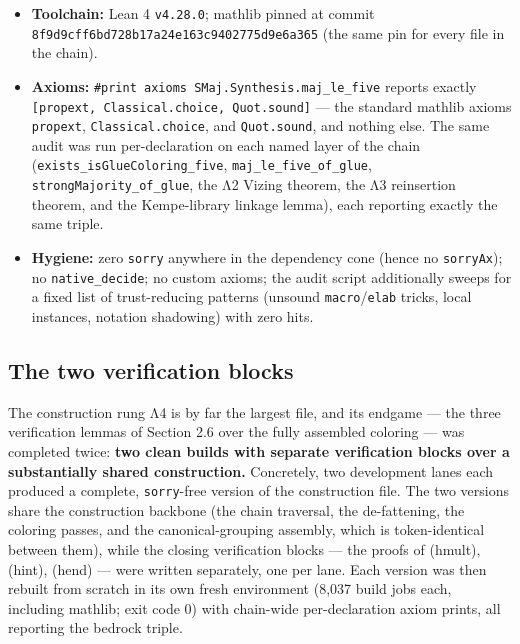 \documentclass[11pt]{article}
\theoremstyle{definition}
\theoremstyle{remark}
\providecommand{\tightlist}{\setlength{\itemsep}{0pt}\setlength{\parskip}{0pt}}
\begin{document}
\begin{sloppypar}
\begin{itemize}
\tightlist
\item
  \textbf{Toolchain:} Lean 4 \texttt{v4.28.0}; mathlib pinned at commit\linebreak
  \texttt{8f9d9cff6bd728b17a24e163}\allowbreak\texttt{c9402775d9e6a365} (the same pin for every file in the chain).
\item
  \textbf{Axioms:}\linebreak
  \texttt{\#print axioms }\allowbreak\texttt{SMaj.Synthesis.maj\_le\_five} reports exactly \texttt{{[}propext, }\allowbreak\texttt{Classical.choice, }\allowbreak\texttt{Quot.sound{]}} --- the standard mathlib axioms \texttt{propext}, \texttt{Classical.choice}, and \texttt{Quot.sound}, and nothing else. The same audit was run per-declaration on each named layer of the chain (\texttt{exists\_\allowbreak isGlueColoring\_\allowbreak five}, \texttt{maj\_\allowbreak le\_\allowbreak five\_\allowbreak of\_\allowbreak glue}, \texttt{strongMajority\_\allowbreak of\_\allowbreak glue}, the Λ2 Vizing theorem, the Λ3 reinsertion theorem, and the Kempe-library linkage lemma), each reporting exactly the same triple.
\item
  \textbf{Hygiene:} zero \texttt{sorry} anywhere in the dependency cone (hence no \texttt{sorryAx}); no \texttt{native\_\allowbreak decide}; no custom axioms; the audit script additionally sweeps for a fixed list of trust-reducing patterns (unsound \texttt{macro}/\texttt{elab} tricks, local instances, notation shadowing) with zero hits.
\end{itemize}
\end{sloppypar}

\subsection{The two verification blocks}\label{34-the-two-verification-blocks}

The construction rung Λ4 is by far the largest file, and its endgame --- the three verification lemmas of Section 2.6 over the fully assembled coloring --- was completed twice: \textbf{two clean builds with separate verification blocks over a substantially shared construction.} Concretely, two development lanes each produced a complete, \texttt{sorry}-free version of the construction file. The two versions share the construction backbone (the chain traversal, the de-fattening, the coloring passes, and the canonical-grouping assembly, which is token-identical between them), while the closing verification blocks --- the proofs of (hmult), (hint), (hend) --- were written separately, one per lane. Each version was then rebuilt from scratch in its own fresh environment (8,037 build jobs each, including mathlib; exit code 0) with chain-wide per-declaration axiom prints, all reporting the bedrock triple.
\end{document}
